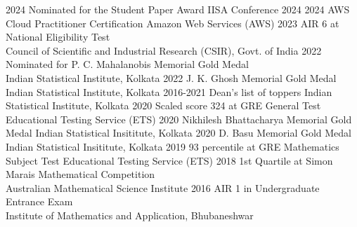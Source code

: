 \documentclass[11pt]{developercv} %
\begin{document}
\vspace{-0.2cm}
\begin{entrylist}
    \vspace*{-0.5cm}
    \entry
    {2024}
    {Nominated for the Student Paper Award}
    {IISA Conference 2024}
    {}
    \vspace*{-0.5cm}
    \entry
    {2024}
    {AWS Cloud Practitioner Certification}
    {Amazon Web Services (AWS)}
    {}
    \vspace*{-0.5cm}
    \entry
    {2023}
    {AIR 6 at National Eligibility Test\\}
    {Council of Scientific and Industrial Research (CSIR), Govt. of India}
    {}
    \vspace*{-0.5cm}
    \entry
    {2022}
    {Nominated for P. C. Mahalanobis Memorial Gold Medal\\}
    {Indian Statistical Institute, Kolkata}
    {}
    \vspace*{-0.5cm}
    \entry
    {2022}
    {J. K. Ghosh Memorial Gold Medal}
    {Indian Statistical Institute, Kolkata}
    {}
    \vspace*{-0.5cm}
    \entry
    {2016-2021}
    {Dean's list of toppers}
    {Indian Statistical Institute, Kolkata}
    {}
    \vspace*{-0.5cm}
    \entry
    {2020}
    {Scaled score 324 at GRE General Test}
    {Educational Testing Service (ETS)}
    {}
    \vspace*{-0.5cm}
    \entry
    {2020}
    {Nikhilesh Bhattacharya Memorial Gold Medal}
    {Indian Statistical Insititute, Kolkata}
    {}
    \vspace*{-0.5cm}
    \entry
    {2020}
    {D. Basu Memorial Gold Medal}
    {Indian Statistical Insititute, Kolkata}
    {}
    \vspace*{-0.5cm}
    \entry
    {2019}
    {93 percentile at GRE Mathematics Subject Test}
    {Educational Testing Service (ETS)}
    {}
    \vspace*{-0.5cm}
    \entry
    {2018}
    {1st Quartile at Simon Marais Mathematical Competition\\}
    {Australian Mathematical Science Institute}
    {}
    \vspace*{-0.5cm}
    \entry
    {2016}
    {AIR 1 in Undergraduate Entrance Exam\\}
    {Institute of Mathematics and Application, Bhubaneshwar}
    {}
\end{entrylist}
\end{document}
